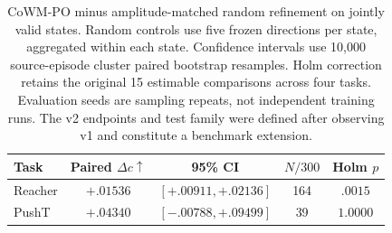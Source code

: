 \begin{table}[t]
\centering
\small
\setlength{\tabcolsep}{3pt}
\begin{tabular}{lcccc}
\toprule
Task & Paired $\Delta c\uparrow$ & 95\% CI & $N/300$ & Holm $p$ \\
\midrule
Reacher & $\mathbf{+.01536}$ & $[+.00911,+.02136]$ & 164 & $\mathbf{.0015}$ \\
PushT & $+.04340$ & $[-.00788,+.09499]$ & 39 & $1.0000$ \\
\bottomrule
\end{tabular}
\caption{CoWM-PO minus amplitude-matched random refinement on jointly valid states. Random controls use five frozen directions per state, aggregated within each state. Confidence intervals use 10,000 source-episode cluster paired bootstrap resamples. Holm correction retains the original 15 estimable comparisons across four tasks. Evaluation seeds are sampling repeats, not independent training runs. The v2 endpoints and test family were defined after observing v1 and constitute a benchmark extension.}
\label{tab:table3b_random_paired}
\end{table}
